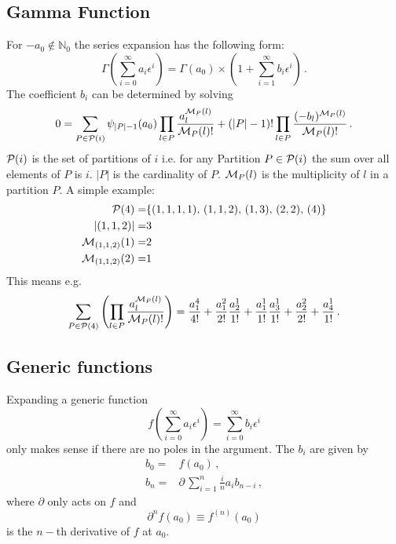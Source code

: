 \documentclass{article}
\begin{document}
\subsection{Gamma Function}
\label{sec:impl_gamma}

For $-a_0 \notin \mathbb{N}_0$ the series expansion has the following
form:
\begin{equation}
  \label{eq:gamma}
  \Gamma\left(\sum_{i=0}^\infty a_i\epsilon^i\right) =
  \Gamma(a_0)\times\left(1+\sum_{i=1}^\infty b_i\epsilon^i\right)\,.
\end{equation}
The coefficient $b_i$ can be determined by solving
\begin{equation}
  \label{eq:gamma_rec}
  0 = \sum_{P \in \mathcal{P}(i)} \psi_{|P|-1}(a_0)\prod_{l\in
    P}\frac{a_l^{{\cal M}_P(l)}}{{\cal M}_P(l)!}
+ (|P|-1)!\*\prod_{l \in P}\frac{(-b_l)^{{\cal M}_P(l)}}{{\cal M}_P(l)!}\,.
\end{equation}
${\cal P}(i)$ is the set of partitions of $i$ i.e. for any
Partition $P \in {\cal P}(i)$ the sum over all elements of $P$ is
$i$. $|P|$ is the cardinality of $P$.
${\cal M}_P(l)$ is the multiplicity of $l$ in a partition $P$. A simple
example:
\begin{align*}
  {\cal P}(4)=&\{(1,1,1,1),\,(1,1,2),\,(1,3),\,(2,2),\,(4)\}\\
  |(1,1,2)|=&3\\
  {\cal M}_{(1,1,2)}(1)=&2\\
  {\cal M}_{(1,1,2)}(2)=&1\\
\end{align*}
This means e.g.
\begin{equation}
  \label{eq:exp_ex}
\sum_{P \in {\cal P}(4)} \left(\prod_{l \in P} \frac{a^{{\cal M}_P(l)}_l}{{\cal M}_P(l)!} \right)=
  \frac{a_1^4}{4!}+\frac{a_1^2}{2!}\frac{a_2^1}{1!}+\frac{a_1^1}{1!}\frac{a_3^1}{1!}+\frac{a_2^2}{2!}+\frac{a_4^1}{1!}\,.
\end{equation}


\subsection{Generic functions}
\label{sec:generic_fun}

Expanding a generic function
\begin{equation}
  \label{eq:generic_fun}
  f\left(\sum_{i=0}^{\infty}a_i
    \epsilon^i\right)=\sum_{i=0}^{\infty}b_i
    \epsilon^i
\end{equation}
only makes sense if there are no poles in the argument.
The $b_i$ are given by
\begin{align}
  \label{eq:generic_rec}
  b_0=&f(a_0)\,,\\
  b_n=&\partial\,\sum_{i=1}^{n}\frac{i}{n} a_{i}b_{n-i} \,,
\end{align}
where $\partial$ only acts on $f$ and
\begin{equation}
  \label{eq:partial}
  \partial^n f(a_0) \equiv f^{(n)}(a_0)
\end{equation}
is the $n-$th derivative of $f$ at $a_0$.
\end{document}
